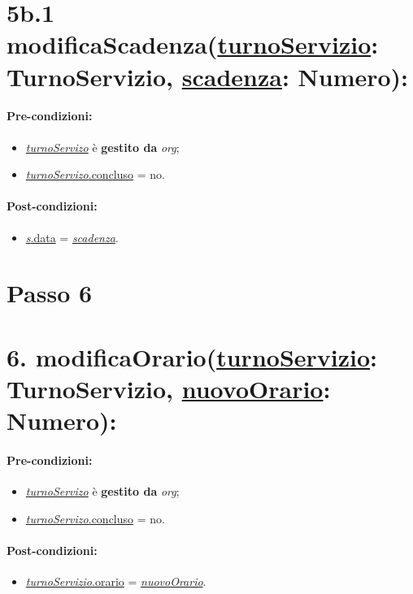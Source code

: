 {\section*{5b.1 modificaScadenza(\underline{turnoServizio}: TurnoServizio, \underline{scadenza}: Numero):}

\paragraph{Pre-condizioni:}
\begin{itemize}
     \item \underline{\textit{turnoServizo}} è \textbf{gestito da} {\textit{org}};
   \item \underline{\textit{turnoServizo}.concluso} = no.
\end{itemize}

\paragraph{Post-condizioni:}
\begin{itemize}
    \item \underline{\textit{s}.data} = \underline{\textit{scadenza}}.
\end{itemize}

\section{Passo 6}
\section*{6. modificaOrario(\underline{turnoServizio}: TurnoServizio, \underline{nuovoOrario}: Numero):}

\paragraph{Pre-condizioni:}
\begin{itemize}
   \item \underline{\textit{turnoServizo}} è \textbf{gestito da} {\textit{org}};
   \item \underline{\textit{turnoServizo}.concluso} = no.
\end{itemize}

\paragraph{Post-condizioni:}

\begin{itemize}
    \item \underline{\textit{turnoServizio}.orario} = \underline{\textit{nuovoOrario}}.
\end{itemize}

}
